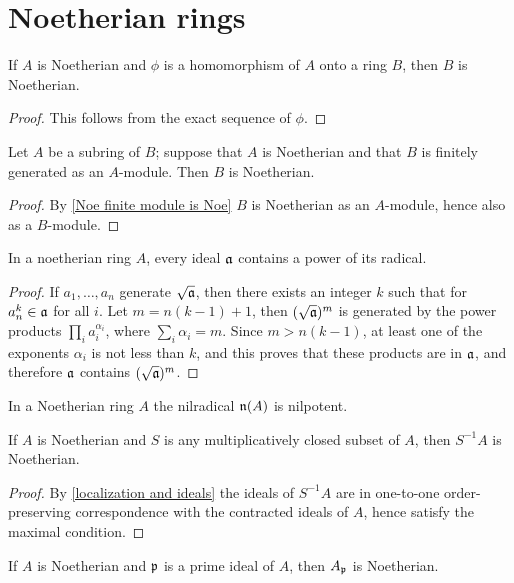 \section{Noetherian rings}
\begin{proposition}\label{Noe homomorphic image is Noe}
If $A$ is Noetherian and $\phi$ is a homomorphism of $A$ onto a ring $B$, then $B$ is Noetherian.
\end{proposition}
\begin{proof}
This follows from the exact sequence of $\phi$.
\end{proof}
\begin{proposition}
Let $A$ be a subring of $B$; suppose that $A$ is Noetherian and that $B$ is finitely generated as an $A$-module. Then $B$ is Noetherian.
\end{proposition}
\begin{proof}
By \cref{Noe finite module is Noe} $B$ is Noetherian as an $A$-module, hence also as a $B$-module.
\end{proof}
\begin{proposition}\label{Noe ideal contain power of radical}
In a noetherian ring $A$, every ideal $\mathfrak{a}$ contains a power of its radical.
\end{proposition}
\begin{proof}
If $a_1,\dots,a_n$ generate $\sqrt{\mathfrak{a}}$, then there exists an integer $k$ such that for $a_n^k\in\mathfrak{a}$ for all $i$. Let $m=n(k-1)+1$, then $(\sqrt{\mathfrak{a}})^m$ is generated by the power products $\prod_ia_i^{\alpha_i}$, where $\sum_i\alpha_i=m$. Since $m>n(k-1)$, at least one of the exponents $\alpha_i$ is not less than $k$, and this proves that these products are in $\mathfrak{a}$, and therefore $\mathfrak{a}$ contains $(\sqrt{\mathfrak{a}})^m$.
\end{proof}
\begin{corollary}\label{Noe nilradical is nilpotent}
In a Noetherian ring $A$ the nilradical $\mathfrak{n}(A)$ is nilpotent.
\end{corollary}
\begin{proposition}\label{Noe localization is Noe}
If $A$ is Noetherian and $S$ is any multiplicatively closed subset of $A$, then $S^{-1}A$ is Noetherian.
\end{proposition}
\begin{proof}
By \cref{localization and ideals} the ideals of $S^{-1}A$ are in one-to-one order-preserving correspondence with the contracted ideals of $A$, hence satisfy the maximal condition. 
\end{proof}
\begin{corollary}
If $A$ is Noetherian and $\mathfrak{p}$ is a prime ideal of $A$, then $A_{\mathfrak{p}}$ is Noetherian.
\end{corollary}
